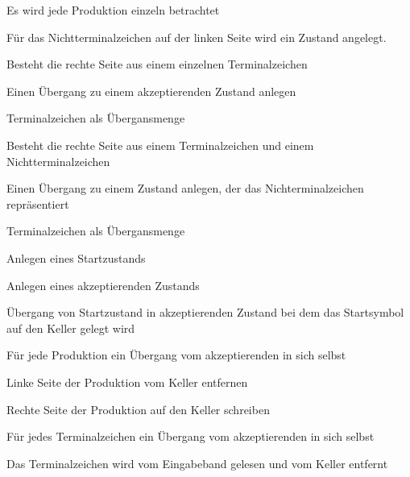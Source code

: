 {
    \begin{itemgroup}{}
	\item Es wird jede Produktion einzeln betrachtet
	\item Für das Nichtterminalzeichen auf der linken Seite wird ein Zustand
	angelegt.
	\item Besteht die rechte Seite aus einem einzelnen Terminalzeichen
  		\begin{itemgroup}{}
    	\item Einen Übergang zu einem akzeptierenden Zustand anlegen
    	\item Terminalzeichen als Übergansmenge
    	\end{itemgroup}
	\item Besteht die rechte Seite aus einem Terminalzeichen und einem Nichtterminalzeichen
  		\begin{itemgroup}{}
    	\item Einen Übergang zu einem Zustand anlegen, der das Nichterminalzeichen
    	repräsentiert
		\item Terminalzeichen als Übergansmenge
		 \end{itemgroup}
    \end{itemgroup}
	\vfill{}
}


{
    \begin{itemgroup}{}
	\item Anlegen eines Startzustands
	\item Anlegen eines akzeptierenden Zustands
	\item Übergang von Startzustand in akzeptierenden Zustand bei dem das 
	Startsymbol auf den Keller gelegt wird
	\item Für jede Produktion ein Übergang vom akzeptierenden in sich selbst
		\begin{itemgroup}{}
    	\item Linke Seite der Produktion vom Keller entfernen
    	\item Rechte Seite der Produktion auf den Keller schreiben
    	\end{itemgroup}
	\item Für jedes Terminalzeichen ein Übergang vom akzeptierenden in sich selbst
		\begin{itemgroup}{}
    	\item Das Terminalzeichen wird vom Eingabeband gelesen und vom Keller
    	entfernt \end{itemgroup}
	\end{itemgroup}
  
	\vfill{}
}



